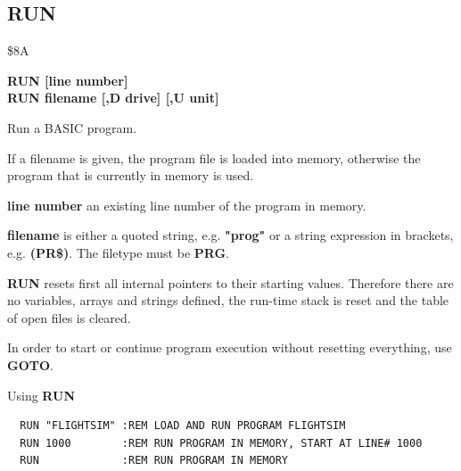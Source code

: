 \subsection{RUN}
\begin{description}[leftmargin=2cm,style=nextline]
\item [Token:] \$8A
\item [Format:] {\bf RUN [line number]} \\
                {\bf RUN filename [,D drive] [,U unit] }
\item [Usage:] Run a BASIC program.

   If a filename is given, the program file is loaded into
   memory, otherwise the program that is currently in memory
   is used.

   {\bf line number}
   an existing line number of the program in memory.

   {\bf filename} is either a quoted string, e.g. {\bf "prog"} or
   a string expression in brackets, e.g. {\bf (PR\$)}.
   The filetype must be {\bf PRG}.

   \drivedefinition

   \unitdefinition

   {\bf RUN} resets first all internal pointers to their
   starting values. Therefore there are no variables, arrays
   and strings defined, the run-time stack is reset and the
   table of open files is cleared.

\item [Remarks:]
   In order to start or continue program execution without
   resetting everything, use {\bf GOTO}.

\item [Example:] Using {\bf RUN}
\begin{tcolorbox}[colback=black,coltext=white]
\verbatimfont{\codefont}
\begin{verbatim}
  RUN "FLIGHTSIM" :REM LOAD AND RUN PROGRAM FLIGHTSIM
  RUN 1000        :REM RUN PROGRAM IN MEMORY, START AT LINE# 1000
  RUN             :REM RUN PROGRAM IN MEMORY
\end{verbatim}
\end{tcolorbox}
\end{description}





\newpage

